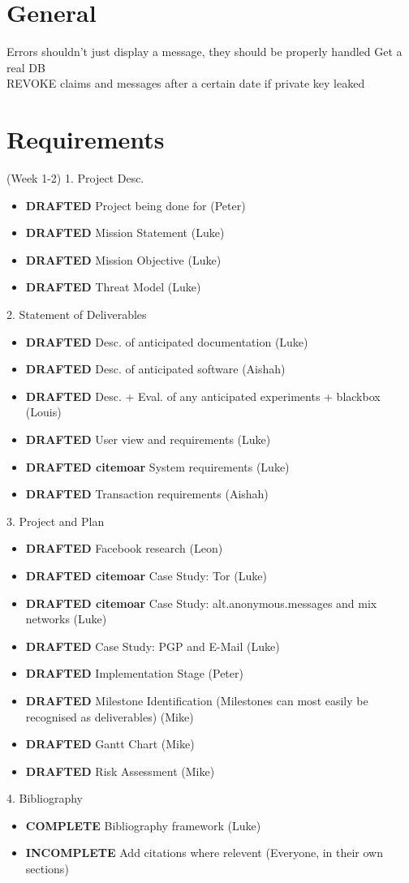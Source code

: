 \section{General}
Errors shouldn't just display a message, they should be properly handled
Get a real DB\\
REVOKE claims and messages after a certain date if private key leaked\\

\section{Requirements} (Week 1-2)
1. Project Desc.
\begin{itemize}
\item \textbf{DRAFTED} Project being done for (Peter)
\item \textbf{DRAFTED} Mission Statement (Luke)
\item \textbf{DRAFTED} Mission Objective (Luke)
\item \textbf{DRAFTED} Threat Model (Luke)
\end{itemize}

2. Statement of Deliverables
\begin{itemize}
\item \textbf{DRAFTED}    Desc. of anticipated documentation (Luke)
\item \textbf{DRAFTED}    Desc. of anticipated software (Aishah)
\item \textbf{DRAFTED}    Desc. + Eval. of any anticipated experiments + blackbox (Louis)
\item \textbf{DRAFTED}    User view and requirements (Luke)
\item \textbf{DRAFTED citemoar}    System requirements (Luke)
\item \textbf{DRAFTED}    Transaction requirements (Aishah)
\end{itemize}

3. Project and Plan
\begin{itemize}
\item \textbf{DRAFTED}     Facebook research (Leon)
\item \textbf{DRAFTED citemoar}     Case Study: Tor (Luke)
\item \textbf{DRAFTED citemoar}     Case Study: alt.anonymous.messages and mix networks (Luke)
\item \textbf{DRAFTED}     Case Study: PGP and E-Mail (Luke)
\item \textbf{DRAFTED}     Implementation Stage (Peter)
\item \textbf{DRAFTED}     Milestone Identification (Milestones can most easily be recognised as deliverables) (Mike)
\item \textbf{DRAFTED}     Gantt Chart (Mike)
\item \textbf{DRAFTED}     Risk Assessment (Mike)
\end{itemize}

4. Bibliography
\begin{itemize}
\item \textbf{COMPLETE}   Bibliography framework (Luke)
\item \textbf{INCOMPLETE} Add citations where relevent (Everyone, in their own sections)
\end{itemize}
